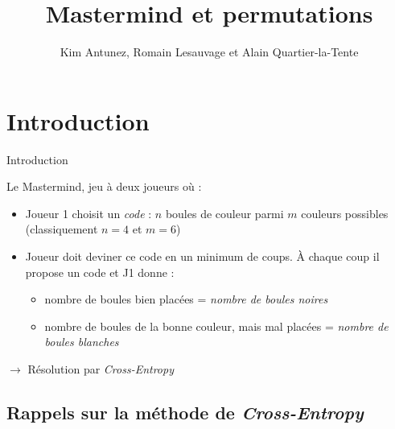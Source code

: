 \documentclass[10pt,xcolor=table,color={dvipsnames,usenames},ignorenonframetext,usepdftitle=false,french]{beamer}
\title{Mastermind et permutations}
\author{Kim Antunez, Romain Lesauvage et Alain Quartier-la-Tente}
\date{}
\providecommand{\tightlist}{%
  \setlength{\parskip}{0pt}
  }
\begin{document}
\begin{frame}
\titlepage
\end{frame}

\hypertarget{introduction}{%
\section{Introduction}\label{introduction}}

\begin{frame}{Introduction}
\protect\hypertarget{introduction-1}{}

Le Mastermind, jeu à deux joueurs où :

\begin{itemize}
\tightlist
\item
  Joueur 1 choisit un \emph{code} : \(n\) boules de couleur parmi \(m\)
  couleurs possibles (classiquement \(n = 4\) et \(m = 6\))\\
\item
  Joueur doit deviner ce code en un minimum de coups. À chaque coup il
  propose un code et J1 donne :

  \begin{itemize}
  \tightlist
  \item
    nombre de boules bien placées = \emph{nombre de boules noires}\\
  \item
    nombre de boules de la bonne couleur, mais mal placées =
    \emph{nombre de boules blanches}
  \end{itemize}
\end{itemize}

\pause

\(\longrightarrow\) Résolution par \emph{Cross-Entropy}

\end{frame}

\hypertarget{rappels-sur-la-muxe9thode-de-cross-entropy}{%
\subsection{\texorpdfstring{Rappels sur la méthode de
\emph{Cross-Entropy}}{Rappels sur la méthode de Cross-Entropy}}\label{rappels-sur-la-muxe9thode-de-cross-entropy}}
\end{document}
